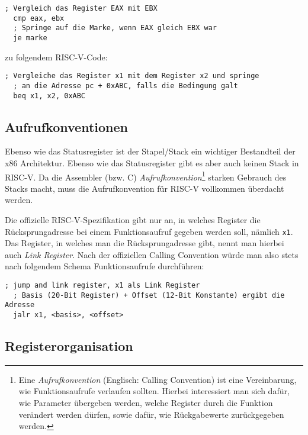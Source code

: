 \begin{lstlisting}[style=x86Assembler]
  ; Vergleich das Register EAX mit EBX
  cmp eax, ebx
  ; Springe auf die Marke, wenn EAX gleich EBX war
  je marke
\end{lstlisting}

zu folgendem RISC-V-Code:

\begin{lstlisting}[style=risc-v_Assembler]
  ; Vergleiche das Register x1 mit dem Register x2 und springe
  ; an die Adresse pc + 0xABC, falls die Bedingung galt
  beq x1, x2, 0xABC
\end{lstlisting}

\subsection{Aufrufkonventionen}

Ebenso wie das Statusregister ist der Stapel/Stack ein wichtiger Bestandteil der x86
Architektur. Ebenso wie das Statusregister gibt es aber auch keinen Stack in
RISC-V. Da die Assembler (bzw. C) \emph{Aufrufkonvention}\footnote{Eine
  \emph{Aufrufkonvention} (Englisch: Calling Convention) ist eine Vereinbarung, wie Funktionsaufrufe verlaufen
  sollten. Hierbei interessiert man sich dafür, wie Parameter übergeben werden,
  welche Register durch die Funktion verändert werden dürfen, sowie dafür, wie
  Rückgabewerte zurückgegeben werden.} starken Gebrauch des Stacks macht,
muss die Aufrufkonvention für RISC-V vollkommen überdacht werden.

Die offizielle RISC-V-Spezifikation gibt nur an, in welches Register die
Rücksprungadresse bei einem Funktionsaufruf gegeben werden soll, nämlich
\lstinline[style=risc-v_Assembler]!x1!. Das Register, in welches man die Rücksprungadresse gibt, nennt man
hierbei auch \emph{Link Register}. Nach der offiziellen Calling Convention würde
man also stets nach folgendem Schema Funktionsaufrufe durchführen:

\begin{lstlisting}[style=risc-v_Assembler]
  ; jump and link register, x1 als Link Register
  ; Basis (20-Bit Register) + Offset (12-Bit Konstante) ergibt die Adresse
  jalr x1, <basis>, <offset>
\end{lstlisting}

\subsection{Registerorganisation}

